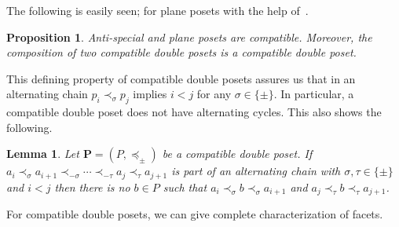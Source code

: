 \documentclass[11pt]{amsart}
\newtheorem{lem}[thm]{Lemma}
\newtheorem{prop}[thm]{Proposition}
\theoremstyle{definition}
\begin{document}
The following is easily seen; for plane posets with the help of~\cite[Prop.~11]{Foissy1}.
\begin{prop}\label{prop:compat}
    Anti-special and  plane posets are compatible. Moreover, the
    composition of two compatible double posets is a compatible double poset.
\end{prop}

This defining property of compatible double posets assures us that in an
alternating chain $p_i \prec_\sigma p_j$ implies $i < j$ for any $\sigma \in
\{\pm\}$. In particular, a compatible double poset does not have 
alternating cycles. This also shows the following.

\begin{lem}\label{lem:compat}
    Let ${\mathbf{P}} = ({P},\preceq_\pm)$ be a compatible double poset.  If $a_{i}
    \prec_\sigma a_{i+1} \prec_{-\sigma} \cdots \prec_{-\tau} a_j \prec_\tau
    a_{j+1}$ is part of an alternating chain with $\sigma,\tau \in \{\pm\}$ and $i <
    j$ then there is no $b \in {P}$ such that $a_i \prec_\sigma b \prec_\sigma
    a_{i+1}$ and $a_j \prec_\tau b \prec_\tau a_{j+1}$.
\end{lem}

For compatible double posets, we can give complete characterization of facets.
\end{document}
